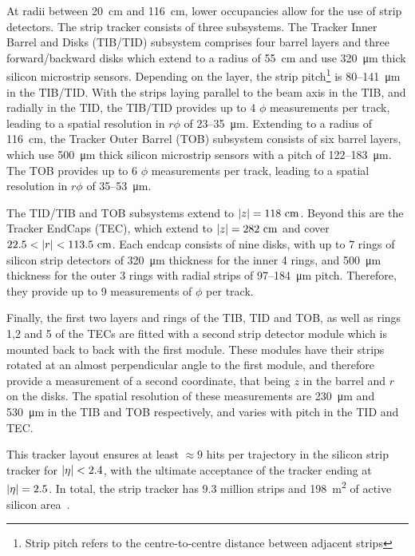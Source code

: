 At radii between 20~\unit{cm} and 116~\unit{cm}, lower occupancies allow for the use of strip detectors. The strip tracker consists of three subsystems. The Tracker Inner Barrel and Disks (TIB/TID) subsystem comprises four barrel layers and three forward/backward disks which extend to a radius of 55~\unit{cm} and use 320~\unit{\micro m} thick silicon microstrip sensors. Depending on the layer, the strip pitch\footnote{Strip pitch refers to the centre-to-centre distance between adjacent strips} is 80--141~\unit{\micro m} in the TIB/TID. With the strips laying parallel to the beam axis in the TIB, and radially in the TID, the TIB/TID provides up to 4 $\phi$ measurements per track, leading to a spatial resolution in $r\phi$ of 23--35~\unit{\micro m}. Extending to a radius of 116~\unit{cm}, the Tracker Outer Barrel (TOB) subsystem consists of six barrel layers, which use 500~\unit{\micro m} thick silicon microstrip sensors with a pitch of 122--183~\unit{\micro m}. The TOB provides up to 6 $\phi$ measurements per track, leading to a spatial resolution in $r\phi$ of 35--53~\unit{\micro m}. 

The TID/TIB and TOB subsystems extend to $\abs{z} = 118~\unit{cm}$. Beyond this are the Tracker EndCaps (TEC), which extend to $\abs{z} = 282~\unit{cm}$ and cover $22.5 < \abs{r} < 113.5~\unit{cm}$. Each endcap consists of nine disks, with up to 7 rings of silicon strip detectors of 320~\unit{\micro m} thickness for the inner 4 rings, and 500~\unit{\micro m} thickness for the outer 3 rings with radial strips of 97--184~\unit{\micro m} pitch. Therefore, they provide up to 9 measurements of $\phi$ per track.

Finally, the first two layers and rings of the TIB, TID and TOB, as well as rings 1,2 and 5 of the TECs are fitted with a second strip detector module which is mounted back to back with the first module. These modules have their strips rotated at an almost perpendicular angle to the first module, and therefore provide a measurement of a second coordinate, that being $z$ in the barrel and $r$ on the disks. The spatial resolution of these measurements are 230~\unit{\micro m} and 530~\unit{\micro m} in the TIB and TOB respectively, and varies with pitch in the TID and TEC.

This tracker layout ensures at least $\approx 9$ hits per trajectory in the silicon strip tracker for $\lvert \eta \rvert < 2.4$, with the ultimate acceptance of the tracker ending at $\lvert \eta \rvert = 2.5$. In total, the strip tracker has 9.3 million strips and 198~\unit{m^2} of active silicon area~\cite{CMS:2008xjf}.